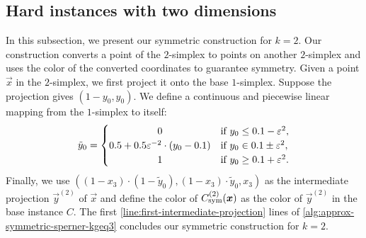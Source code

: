 \subsection{Hard instances with two dimensions}
\label{subsec:symmetric-2d}
In this subsection, we present our symmetric construction for $k=2$. 
Our construction converts a point of the $2$-simplex to points on another $2$-simplex and uses the color of the converted coordinates to guarantee symmetry. 
Given a point $\vec{x}$ in the $2$-simplex, we first project it onto the base $1$-simplex. 
Suppose the projection gives $(1-y_0,y_0)$. 
We define a continuous and piecewise linear mapping from the $1$-simplex to itself: 
\begin{align*}
    \tilde{y}_0 =  \begin{cases}
        \hfill 0 \hfill & \text{if } y_0 \leq 0.1 - \eps^2, \\
        0.5 + 0.5\eps^{-2} \cdot (y_0-0.1) & \text{if } y_0 \in 0.1 \pm  \eps^2, \\
        \hfill 1 \hfill & \text{if } y_0 \geq 0.1 + \eps^2.
    \end{cases}
\end{align*}
Finally, we use $((1-x_3)\cdot (1-\tilde{y}_0), (1-x_3)\cdot \tilde{y}_0, x_3)$ as the intermediate projection $\vec{y}^{(2)}$ of $\vec{x}$ and define the color of $C_{\rm sym}^{(2)}(\boldsymbol{x})$ as the color of $\vec{y}^{(2)}$ in the base instance $C$.
The first \ref{line:first-intermediate-projection} lines of \cref{alg:approx-symmetric-sperner-kgeq3} concludes our symmetric construction for $k=2$.

